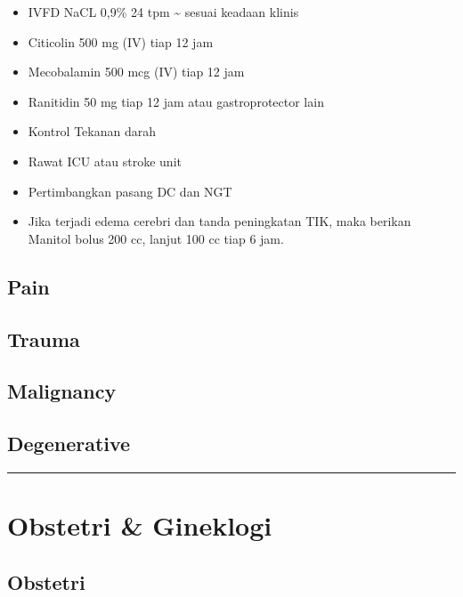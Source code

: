 \documentclass[
]{book}
\providecommand{\tightlist}{%
  \setlength{\itemsep}{0pt}\setlength{\parskip}{0pt}}
\begin{document}
\begin{itemize}
\tightlist
\item
  IVFD NaCL 0,9\% 24 tpm \textasciitilde{} sesuai keadaan klinis
\item
  Citicolin 500 mg (IV) tiap 12 jam
\item
  Mecobalamin 500 mcg (IV) tiap 12 jam
\item
  Ranitidin 50 mg tiap 12 jam atau gastroprotector lain
\item
  Kontrol Tekanan darah
\item
  Rawat ICU atau stroke unit
\item
  Pertimbangkan pasang DC dan NGT
\item
  Jika terjadi edema cerebri dan tanda peningkatan TIK, maka berikan Manitol bolus 200 cc, lanjut 100 cc tiap 6 jam.
\end{itemize}

\hypertarget{pain}{%
\subsection{Pain}\label{pain}}

\hypertarget{trauma-1}{%
\subsection{Trauma}\label{trauma-1}}

\hypertarget{malignancy-3}{%
\subsection{Malignancy}\label{malignancy-3}}

\hypertarget{degenerative}{%
\subsection{Degenerative}\label{degenerative}}

\begin{center}\rule{0.5\linewidth}{0.5pt}\end{center}

\hypertarget{obstetri-gineklogi-1}{%
\section{Obstetri \& Gineklogi}\label{obstetri-gineklogi-1}}

\hypertarget{obstetri}{%
\subsection{Obstetri}\label{obstetri}}
\end{document}
